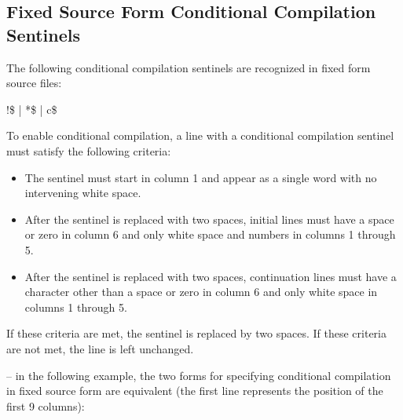 \subsection{Fixed Source Form Conditional Compilation Sentinels}
\label{subsec:Fixed Source Form Conditional Compilation Sentinels}
The following conditional compilation sentinels are recognized in fixed form source 
files:

\begin{boxedcode}
!\$ \textnormal{|} *\$ \textnormal{|} c\$
\end{boxedcode}

To enable conditional compilation, a line with a conditional compilation sentinel must 
satisfy the following criteria: 

\begin{itemize}
\item The sentinel must start in column 1 and appear as a single word with no intervening 
white space. 

\item After the sentinel is replaced with two spaces, initial lines must have a space or zero 
in column 6 and only white space and numbers in columns 1 through 5.

\item After the sentinel is replaced with two spaces, continuation lines must have a 
character other than a space or zero in column 6 and only white space in columns 1 
through 5.
\end{itemize}

If these criteria are met, the sentinel is replaced by two spaces. If these criteria are not 
met, the line is left unchanged.

\notestart
\noteheader – in the following example, the two forms for specifying conditional compilation 
in fixed source form are equivalent (the first line represents the position of the first 9 
columns):

\begin{alltt}
\end{alltt}
\noteend



\begin{figure}[t!]
\end{figure}





